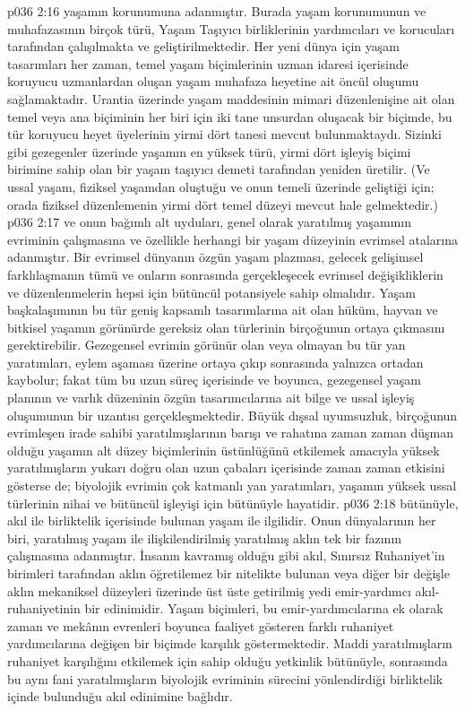 \vs p036 2:16  yaşamın korunumuna adanmıştır. Burada yaşam korunumunun ve muhafazasının birçok türü, Yaşam Taşıyıcı birliklerinin yardımcıları ve korucuları tarafından çalışılmakta ve geliştirilmektedir. Her yeni dünya için yaşam tasarımları her zaman, temel yaşam biçimlerinin uzman idaresi içerisinde koruyucu uzmanlardan oluşan yaşam muhafaza heyetine ait öncül oluşumu sağlamaktadır. Urantia üzerinde yaşam maddesinin mimari düzenlenişine ait olan temel veya ana biçiminin her biri için iki tane unsurdan oluşacak bir biçimde, bu tür koruyucu heyet üyelerinin yirmi dört tanesi mevcut bulunmaktaydı. Sizinki gibi gezegenler üzerinde yaşamın en yüksek türü, yirmi dört işleyiş biçimi birimine sahip olan bir yaşam taşıyıcı demeti tarafından yeniden üretilir. (Ve ussal yaşam, fiziksel yaşamdan oluştuğu ve onun temeli üzerinde geliştiği için; orada fiziksel düzenlemenin yirmi dört temel düzeyi mevcut hale gelmektedir.)
\vs p036 2:17  ve onun bağımlı alt uyduları, genel olarak yaratılmış yaşamının evriminin çalışmasına ve özellikle herhangi bir yaşam düzeyinin evrimsel atalarına adanmıştır. Bir evrimsel dünyanın özgün yaşam plazması, gelecek gelişimsel farklılaşmanın tümü ve onların sonrasında gerçekleşecek evrimsel değişikliklerin ve düzenlenmelerin hepsi için bütüncül potansiyele sahip olmalıdır. Yaşam başkalaşımının bu tür geniş kapsamlı tasarımlarına ait olan hüküm, hayvan ve bitkisel yaşamın görünürde gereksiz olan türlerinin birçoğunun ortaya çıkmasını gerektirebilir. Gezegensel evrimin görünür olan veya olmayan bu tür yan yaratımları, eylem aşaması üzerine ortaya çıkıp sonrasında yalnızca ortadan kaybolur; fakat tüm bu uzun süreç içerisinde ve boyunca, gezegensel yaşam planının ve varlık düzeninin özgün tasarımcılarına ait bilge ve ussal işleyiş oluşumunun bir uzantısı gerçekleşmektedir. Büyük dışsal uyumsuzluk, birçoğunun evrimleşen irade sahibi yaratılmışlarının barışı ve rahatına zaman zaman düşman olduğu yaşamın alt düzey biçimlerinin üstünlüğünü etkilemek amacıyla yüksek yaratılmışların yukarı doğru olan uzun çabaları içerisinde zaman zaman etkisini gösterse de; biyolojik evrimin çok katmanlı yan yaratımları, yaşamın yüksek ussal türlerinin nihai ve bütüncül işleyişi için bütünüyle hayatidir.
\vs p036 2:18  bütünüyle, akıl ile birliktelik içerisinde bulunan yaşam ile ilgilidir. Onun dünyalarının her biri, yaratılmış yaşam ile ilişkilendirilmiş yaratılmış aklın tek bir fazının çalışmasına adanmıştır. İnsanın kavramış olduğu gibi akıl, Sınırsız Ruhaniyet’in birimleri tarafından aklın öğretilemez bir nitelikte bulunan veya diğer bir değişle aklın mekaniksel düzeyleri üzerinde üst üste getirilmiş yedi emir\hyp{}yardımcı akıl\hyp{}ruhaniyetinin bir edinimidir. Yaşam biçimleri, bu emir\hyp{}yardımcılarına ek olarak zaman ve mekânın evrenleri boyunca faaliyet gösteren farklı ruhaniyet yardımcılarına değişen bir biçimde karşılık göstermektedir. Maddi yaratılmışların ruhaniyet karşılığını etkilemek için sahip olduğu yetkinlik bütünüyle, sonrasında bu aynı fani yaratılmışların biyolojik evriminin sürecini yönlendirdiği birliktelik içinde bulunduğu akıl edinimine bağlıdır.
